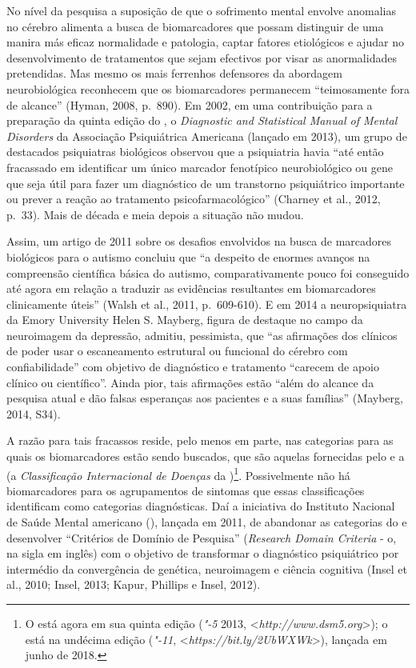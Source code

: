 No nível da pesquisa a suposição de que o sofrimento mental envolve
anomalias no cérebro alimenta a busca de biomarcadores que possam
distinguir de uma manira más eficaz normalidade e patologia, captar
fatores etiológicos e ajudar no desenvolvimento de tratamentos que sejam
efectivos por visar as anormalidades pretendidas. Mas mesmo os mais
ferrenhos defensores da abordagem neurobiológica reconhecem que os
biomarcadores permanecem ``teimosamente fora de alcance'' (Hyman, 2008,
p.~890). Em 2002, em uma contribuição para a preparação da quinta edição
do , o \emph{Diagnostic and Statistical Manual of Mental Disorders}
da Associação Psiquiátrica Americana (lançado em 2013), um grupo de
destacados psiquiatras biológicos observou que a psiquiatria havia ``até
então fracassado em identificar um único marcador fenotípico
neurobiológico ou gene que seja útil para fazer um diagnóstico de um
transtorno psiquiátrico importante ou prever a reação ao tratamento
psicofarmacológico'' (Charney et al., 2012, p.~33). Mais de década e meia
depois a situação não mudou.

Assim, um artigo de 2011 sobre os desafios envolvidos na busca de
marcadores biológicos para o autismo concluiu que ``a despeito de
enormes avanços na compreensão científica básica do autismo,
comparativamente pouco foi conseguido até agora em relação a traduzir as
evidências resultantes em biomarcadores clinicamente úteis'' (Walsh et
al., 2011, p.~609-610). E em 2014 a neuropsiquiatra da Emory University
Helen S. Mayberg, figura de destaque no campo da neuroimagem da
depressão, admitiu, pessimista, que ``as afirmações dos clínicos de
poder usar o escaneamento estrutural ou funcional do cérebro com
confiabilidade'' com objetivo de diagnóstico e tratamento ``carecem de
apoio clínico ou científico''. Ainda pior, tais afirmações estão ``além
do alcance da pesquisa atual e dão falsas esperanças aos pacientes e a
suas famílias'' (Mayberg, 2014, S34).

A razão para tais fracassos reside, pelo menos em parte, nas categorias
para as quais os biomarcadores estão sendo buscados, que são aquelas
fornecidas pelo \emph{} e a \emph{} (a \emph{Classificação
Internacional de Doenças} da )\footnote[1]{O  está agora em sua quinta edição (\emph{"-5} 2013,
\textless{}\emph{http://www.dsm5.org}\textgreater{}); o \emph{} está na undécima edição
(\emph{"-11}, \textless{}\emph{https://bit.ly/2UbWXWk}\textgreater{}),
lançada em junho de 2018.}. Possivelmente não
há biomarcadores para os agrupamentos de sintomas que essas
classificações identificam como categorias diagnósticas. Daí a
iniciativa do Instituto Nacional de Saúde Mental americano (),
lançada em 2011, de abandonar as categorias do  e desenvolver
``Critérios de Domínio de Pesquisa'' (\emph{Research Domain Criteria} -
o, na sigla em inglês) com o objetivo de transformar o diagnóstico
psiquiátrico por intermédio da convergência de genética, neuroimagem e
ciência cognitiva (Insel et al., 2010; Insel, 2013; Kapur, Phillips e
Insel, 2012).

